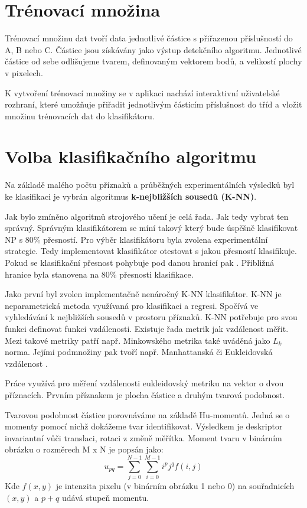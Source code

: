 \documentclass[11pt,twoside,a4paper,table]{book}
\begin{document}
\section{Trénovací množina}
Trénovací množinu dat tvoří data jednotlivé částice s přiřazenou příslušností do A, B nebo C. Částice jsou získávány jako výstup detekčního algoritmu. Jednotlivé částice od sebe odlišujeme tvarem, definovaným vektorem bodů, a velikostí plochy v pixelech.

K vytvoření trénovací množiny se v aplikaci nachází interaktivní uživatelské rozhraní, které umožňuje přiřadit jednotlivým částicím příslušnost do tříd a vložit množinu trénovacích dat do klasifikátoru.

\section{Volba klasifikačního algoritmu}

Na základě malého počtu příznaků a průběžných experimentálních výsledků byl ke klasifikaci je vybrán algoritmus \textbf{k-nejbližších sousedů (K-NN)}.

Jak bylo zmíněno algoritmů strojového učení je celá řada. Jak tedy vybrat ten správný. Správným klasifikátorem se míní takový který bude úspěšně klasifikovat NP s 80\% přesností. Pro výběr klasifikátoru byla zvolena experimentální strategie. Tedy implementovat klasifikátor otestovat s jakou přesností klasifikuje. Pokud se klasifikační přesnost pohybuje pod danou hranicí pak . Přibližná hranice byla stanovena na 80\% přesnosti klasifikace.

Jako první byl zvolen implementačně nenáročný K-NN klasifikátor. K-NN je neparametrická metoda využívaná pro klasifikaci a regresi. Spočívá ve vyhledávání k nejbližších sousedů v prostoru příznaků. K-NN potřebuje pro svou funkci definovat funkci vzdálenosti. Existuje řada metrik jak vzdálenost měřit. Mezi takové metriky patří např. Minkowského metrika také uváděná jako $L_{k}$ norma. Jejími podmnožiny pak tvoří např. Manhattanská či Eukleidovská vzdálenost \cite{book:pattern_class}.

Práce využívá pro měření vzdálenosti eukleidovský metriku na vektor o dvou příznacích. Prvním příznakem je plocha částice a druhým tvarová podobnost.

Tvarovou podobnost částice porovnáváme na základě Hu-momentů\citep{Hu1962}. Jedná se o momenty pomocí nichž dokážeme tvar identifikovat. Výsledkem je deskriptor invariantní vůči translaci, rotaci z změně měřítka. Moment tvaru v binárním obrázku o rozměrech M x N je popsán jako:
\begin{equation}
u_{pq} = \sum^{N-1}_{j=0}\sum^{M-1}_{i=0} i^p j^q f(i,j)
\label{eq:moment}
\end{equation}
Kde $f(x,y)$ je intenzita pixelu (v binárním obrázku 1 nebo 0) na souřadnicích $(x,y)$ a $p+q$ udává stupeň momentu.
\end{document}
